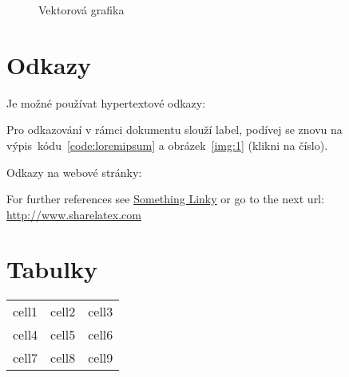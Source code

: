 \newpage

\vspace{0.5cm}
\begin{figure}[h!]
\begin{center}
\caption{Vektorová grafika}
\label{img:2}
\end{center}
\end{figure}


\section{Odkazy}

Je možné používat hypertextové odkazy:

\vspace{0.5cm}
\noindent Pro odkazování v rámci dokumentu slouží label, podívej se znovu na výpis~kódu~\ref{code:loremipsum} a obrázek~\ref{img:1} (klikni na číslo).

\vspace{0.5cm}
\noindent Odkazy na webové stránky:

\noindent For further references see \href{http://www.sharelatex.com}{Something Linky} 
or go to the next url: \url{http://www.sharelatex.com}

\section{Tabulky}

\begin{center}
\begin{tabular}{ c c c }
 cell1 & cell2 & cell3 \\ 
 cell4 & cell5 & cell6 \\  
 cell7 & cell8 & cell9    
\end{tabular}
\end{center}


